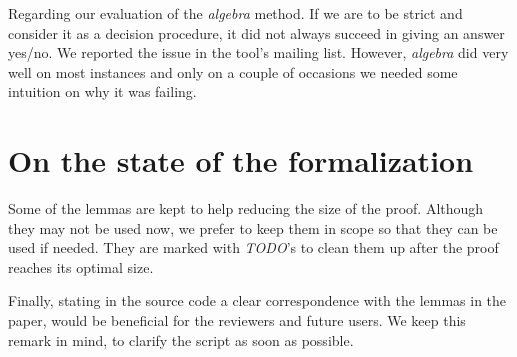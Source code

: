 \documentclass[runningheads]{llncs}
\begin{document}
Regarding our evaluation of the \textit{algebra} method. If we are to be strict and consider it as a decision procedure, it did not always succeed in giving an answer yes/no. We reported the issue in the tool's mailing list. However, \textit{algebra} did very well on most instances and only on a couple of occasions we needed some intuition on why it was failing.

\section{On the state of the formalization}

Some of the lemmas are kept to help reducing the size of the proof. Although they may not be used now, we prefer to keep them in scope so that they can be used if needed. They are marked with \textit{TODO}'s to clean them up after the proof reaches its optimal size.

Finally, stating in the source code a clear correspondence with the lemmas in the paper, would be beneficial for the reviewers and future users. We keep this remark in mind, to clarify the script as soon as possible. 
\end{document}
